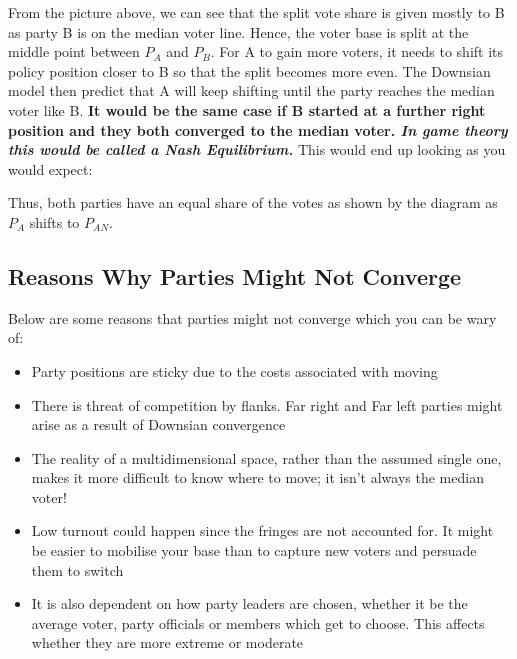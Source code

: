\documentclass[12pt, letterpaper]{article}
\begin{document}
From the picture above, we can see that the split vote share is given mostly to B as party B is on the median voter line. Hence, the voter base is split at the middle point between $P_A$ and $P_B$. For A to gain more voters, it needs to shift its policy position closer to B so that the split becomes more even. The Downsian model then predict that A will keep shifting until the party reaches the median voter like B. \textbf{It would be the same case if B started at a further right position and they both converged to the median voter. \textit{In game theory this would be called a Nash Equilibrium.}} This would end up looking as you would expect:
\begin{center}
\end{center}

Thus, both parties have an equal share of the votes as shown by the diagram as $P_A$ shifts to $P_{AN}$.

\subsection{Reasons Why Parties Might Not Converge}
Below are some reasons that parties might not converge which you can be wary of:
\begin{itemize}
	\item Party positions are sticky due to the costs associated with moving
	\item There is threat of competition by flanks. Far right and Far left parties might arise as a result of Downsian convergence
	\item The reality of a multidimensional space, rather than the assumed single one, makes it more difficult to know where to move; it isn't always the median voter!
	\item Low turnout could happen since the fringes are not accounted for. It might be easier to mobilise your base than to capture new voters and persuade them to switch
	\item It is also dependent on how party leaders are chosen, whether it be the average voter, party officials or members which get to choose. This affects whether they are more extreme or moderate
 
\end{itemize}
\end{document}
